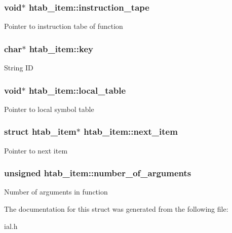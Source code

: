 \subsubsection[{instruction\+\_\+tape}]{\setlength{\rightskip}{0pt plus 5cm}void$\ast$ htab\+\_\+item\+::instruction\+\_\+tape}\label{structhtab__item_a88ce186940697b2875ed88bdaca2db12}
Pointer to instruction tabe of function \hypertarget{structhtab__item_a66b265819081d3527ad1941f8bcb09d6}{}
\subsubsection[{key}]{\setlength{\rightskip}{0pt plus 5cm}char$\ast$ htab\+\_\+item\+::key}\label{structhtab__item_a66b265819081d3527ad1941f8bcb09d6}
String I\+D \hypertarget{structhtab__item_ab925f22b6d466d9d5c6e3099b79dfb58}{}
\subsubsection[{local\+\_\+table}]{\setlength{\rightskip}{0pt plus 5cm}void$\ast$ htab\+\_\+item\+::local\+\_\+table}\label{structhtab__item_ab925f22b6d466d9d5c6e3099b79dfb58}
Pointer to local symbol table \hypertarget{structhtab__item_a8fe0d8f000c284334b0d939982239030}{}
\subsubsection[{next\+\_\+item}]{\setlength{\rightskip}{0pt plus 5cm}struct {\bf htab\+\_\+item}$\ast$ htab\+\_\+item\+::next\+\_\+item}\label{structhtab__item_a8fe0d8f000c284334b0d939982239030}
Pointer to next item \hypertarget{structhtab__item_a3f6b7b1fb06bd1a500375bd68a26685d}{}
\subsubsection[{number\+\_\+of\+\_\+arguments}]{\setlength{\rightskip}{0pt plus 5cm}unsigned htab\+\_\+item\+::number\+\_\+of\+\_\+arguments}\label{structhtab__item_a3f6b7b1fb06bd1a500375bd68a26685d}
Number of arguments in function 

The documentation for this struct was generated from the following file\+:\begin{DoxyCompactItemize}
\item 
ial.\+h\end{DoxyCompactItemize}
